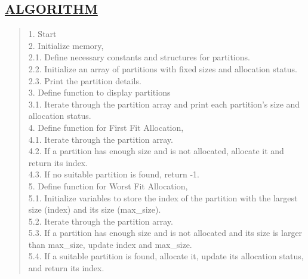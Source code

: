 \documentclass[a4paper, 12pt]{article}
\begin{document}
\subsection*{\underline{ALGORITHM}}
\begin{quote}
1. Start\\
2. Initialize memory,\\
\hspace*{1cm} 2.1. Define necessary constants and structures for partitions.\\
\hspace*{1cm} 2.2. Initialize an array of partitions with fixed sizes and allocation status.\\
\hspace*{1cm} 2.3. Print the partition details.\\
3. Define function to display partitions\\
\hspace*{1cm} 3.1. Iterate through the partition array and print each partition’s size and allocation status.\\
4. Define function for First Fit Allocation,\\
\hspace*{1cm} 4.1. Iterate through the partition array.\\
\hspace*{1cm} 4.2. If a partition has enough size and is not allocated, allocate it and return its \hspace*{2cm} index.\\
\hspace*{1cm} 4.3. If no suitable partition is found, return -1.\\
5. Define function for Worst Fit Allocation,\\
\hspace*{1cm} 5.1. Initialize variables to store the index of the partition with the largest size \hspace*{2cm} (index) and its size (max\_size). \\
\hspace*{1cm} 5.2. Iterate through the partition array.\\
\hspace*{1cm} 5.3. If a partition has enough size and is not allocated and its size is larger than \hspace*{2cm} max\_size, update index and max\_size.\\
\hspace*{1cm} 5.4. If a suitable partition is found, allocate it, update its allocation status, and \hspace*{2cm} return its index.\\

\end{quote}
\end{document}
